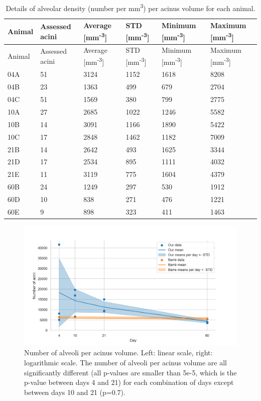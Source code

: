 \documentclass[
  american,
]{article}
\begin{document}
\begin{longtable}[]{@{}llllll@{}}
\caption{Details of alveolar density (number per mm\textsuperscript{3}) per acinus volume for each animal. \label{tbl:density}}\tabularnewline
\toprule
Animal & Assessed acini & Average {[}mm\textsuperscript{-3}{]} & STD {[}mm\textsuperscript{-3}{]} & Minimum {[}mm\textsuperscript{-3}{]} & Maximum {[}mm\textsuperscript{-3}{]}\tabularnewline
\midrule
\endfirsthead
\toprule
Animal & Assessed acini & Average {[}mm\textsuperscript{-3}{]} & STD {[}mm\textsuperscript{-3}{]} & Minimum {[}mm\textsuperscript{-3}{]} & Maximum {[}mm\textsuperscript{-3}{]}\tabularnewline
\midrule
\endhead
04A & 51 & 3124 & 1152 & 1618 & 8208\tabularnewline
04B & 23 & 1363 & 499 & 679 & 2704\tabularnewline
04C & 51 & 1569 & 380 & 799 & 2775\tabularnewline
10A & 27 & 2685 & 1022 & 1246 & 5582\tabularnewline
10B & 14 & 3091 & 1166 & 1890 & 5422\tabularnewline
10C & 17 & 2848 & 1462 & 1182 & 7009\tabularnewline
21B & 14 & 2642 & 493 & 1625 & 3344\tabularnewline
21D & 17 & 2534 & 895 & 1111 & 4032\tabularnewline
21E & 11 & 3119 & 775 & 1604 & 4379\tabularnewline
60B & 24 & 1249 & 297 & 530 & 1912\tabularnewline
60D & 10 & 838 & 271 & 476 & 1221\tabularnewline
60E & 9 & 898 & 323 & 411 & 1463\tabularnewline
\bottomrule
\end{longtable}

\begin{figure}
\hypertarget{fig:05}{%
\centering
\includegraphics{images/fig05.png}
\caption{Number of alveoli per acinus volume.
Left: linear scale, right: logarithmic scale.
The number of alveoli per acinus volume are all significantly different (all p-values are smaller than 5e-5, which is the p-value between days 4 and 21) for each combination of days except between days 10 and 21 (p=0.7).}\label{fig:05}
}
\end{figure}
\end{document}
